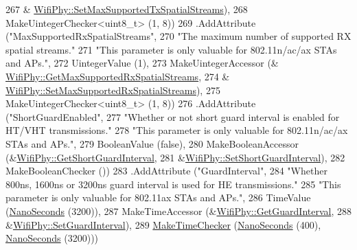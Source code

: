 \begin{DoxyCode}
267                                          &
      \hyperlink{classns3_1_1WifiPhy_a4c4529066f8b7aa72ba1c79e59e20ca3}{WifiPhy::SetMaxSupportedTxSpatialStreams}),
268                    MakeUintegerChecker<uint8\_t> (1, 8))
269     .AddAttribute (\textcolor{stringliteral}{"MaxSupportedRxSpatialStreams"},
270                    \textcolor{stringliteral}{"The maximum number of supported RX spatial streams."}
271                    \textcolor{stringliteral}{"This parameter is only valuable for 802.11n/ac/ax STAs and APs."},
272                    UintegerValue (1),
273                    MakeUintegerAccessor (&
      \hyperlink{classns3_1_1WifiPhy_a493d72ea8ba91bb2fda9185c39c419c8}{WifiPhy::GetMaxSupportedRxSpatialStreams},
274                                          &
      \hyperlink{classns3_1_1WifiPhy_a1e4f1ade2676db0ef5b71b7e05c78194}{WifiPhy::SetMaxSupportedRxSpatialStreams}),
275                    MakeUintegerChecker<uint8\_t> (1, 8))
276     .AddAttribute (\textcolor{stringliteral}{"ShortGuardEnabled"},
277                    \textcolor{stringliteral}{"Whether or not short guard interval is enabled for HT/VHT transmissions."}
278                    \textcolor{stringliteral}{"This parameter is only valuable for 802.11n/ac/ax STAs and APs."},
279                    BooleanValue (\textcolor{keyword}{false}),
280                    MakeBooleanAccessor (&\hyperlink{classns3_1_1WifiPhy_ae907e448ace9df4d647c8f97bbec23fc}{WifiPhy::GetShortGuardInterval},
281                                         &\hyperlink{classns3_1_1WifiPhy_a3b53079e099f77124695c8d0612fa669}{WifiPhy::SetShortGuardInterval}),
282                    MakeBooleanChecker ())
283     .AddAttribute (\textcolor{stringliteral}{"GuardInterval"},
284                    \textcolor{stringliteral}{"Whether 800ns, 1600ns or 3200ns guard interval is used for HE transmissions."}
285                    \textcolor{stringliteral}{"This parameter is only valuable for 802.11ax STAs and APs."},
286                    TimeValue (\hyperlink{group__timecivil_ga281d64bcb4dad96267d83c7688ec433f}{NanoSeconds} (3200)),
287                    MakeTimeAccessor (&\hyperlink{classns3_1_1WifiPhy_adb22fbf368dfbf0864f08319d8fcb86e}{WifiPhy::GetGuardInterval},
288                                      &\hyperlink{classns3_1_1WifiPhy_a56f3ff8e4a93d94649a3e9982f381d16}{WifiPhy::SetGuardInterval}),
289                    \hyperlink{group__time_ga7032965bd4afa578691d88c09e4481c1}{MakeTimeChecker} (\hyperlink{group__timecivil_ga281d64bcb4dad96267d83c7688ec433f}{NanoSeconds} (400), 
      \hyperlink{group__timecivil_ga281d64bcb4dad96267d83c7688ec433f}{NanoSeconds} (3200)))

\end{DoxyCode}
